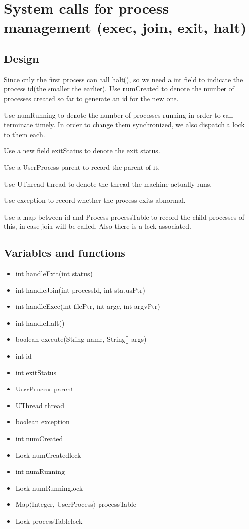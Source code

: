 \documentclass[a4paper,10pt]{article}
\begin{document}
\section{System calls for process management (exec, join, exit, halt)}

\subsection{Design}
Since only the first process can call halt(), so we need a int field to indicate the process id(the smaller the earlier). Use numCreated to denote the number of processes created so far to generate an id for the new one.

Use numRunning to denote the number of processes running in order to call terminate timely. In order to change them synchronized, we also dispatch a lock to them each.

Use a new field exitStatus to denote the exit status.

Use a UserProcess parent to record the parent of it.

Use UThread thread to denote the thread the machine actually runs.

Use exception to record whether the process exits abnormal.

Use a map between id and Process processTable to record the child processes of this, in case join will be called. Also there is a lock associated.
\subsection{Variables and functions}
\begin{itemize}
\item int handleExit(int status)
\item int handleJoin(int processId, int statusPtr)
\item int handleExec(int filePtr, int argc, int argvPtr)
\item int handleHalt()
\item boolean execute(String name, String[] args)
\end{itemize}

\begin{itemize}
\item int id
\item int exitStatus
\item UserProcess parent
\item UThread thread
\item boolean exception
\item int numCreated
\item Lock numCreatedlock
\item int numRunning
\item Lock numRunninglock
\item Map$\langle$Integer, UserProcess$\rangle$ processTable
\item Lock processTablelock
\end{itemize}
\end{document}
